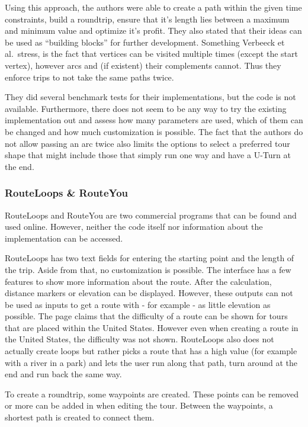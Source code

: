 Using this approach, the authors were able to create a path within the given time constraints, build a roundtrip, ensure that it's length lies between a maximum and minimum value and optimize it's profit.
They also stated that their ideas can be used as \enquote{building blocks}  \cite{verbeeck_extension_2014} for further development.
Something Verbeeck et al.\ stress, is the fact that vertices can be visited multiple times (except the start vertex), however arcs and (if existent) their complements cannot. 
Thus they enforce trips to not take the same paths twice.

They did several benchmark tests for their implementations, but the code is not available.
Furthermore, there does not seem to be any way to try the existing implementation out and assess how many parameters are used, which of them can be changed and how much customization is possible.
The fact that the authors do not allow passing an arc twice also limits the options to select a preferred tour shape that might include those that simply run one way and have a U-Turn at the end. 


\subsubsection{RouteLoops \& RouteYou}
\label{subsubsec:routeLoopsrouteYou}

RouteLoops and RouteYou are two commercial programs that can be found and used online. 
However, neither the code itself nor information about the implementation can be accessed.

RouteLoops has two text fields for entering the starting point and the length of the trip.
Aside from that, no customization is possible.
The interface has a few features to show more information about the route.
After the calculation, distance markers or elevation can be displayed.
However, these outputs can not be used as inputs to get a route with - for example - as little elevation as possible.
The page claims that the difficulty of a route can be shown for tours that are placed within the United States.
However even when creating a route in the United States, the difficulty was not shown. 
RouteLoops also does not actually create loops but rather picks a route that has a high value (for example with a river in a park) and lets the user run along that path, turn around at the end and run back the same way.

To create a roundtrip, some waypoints are created. 
These points can be removed or more can be added in when editing the tour.
Between the waypoints, a shortest path is created to connect them. 

